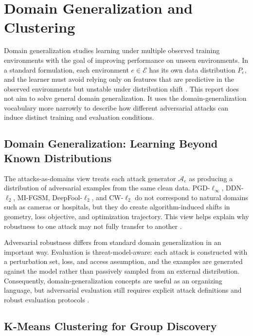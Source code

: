 \section{Domain Generalization and Clustering}

Domain generalization studies learning under multiple observed training environments with the goal of improving performance on unseen environments. In a standard formulation, each environment $e\in\mathcal{E}$ has its own data distribution $P_e$, and the learner must avoid relying only on features that are predictive in the observed environments but unstable under distribution shift \cite{arjovsky2019irm,gulrajani2021domainbed}. This report does not aim to solve general domain generalization. It uses the domain-generalization vocabulary more narrowly to describe how different adversarial attacks can induce distinct training and evaluation conditions.

\subsection{Domain Generalization: Learning Beyond Known Distributions}

The attacks-as-domains view treats each attack generator $\mathcal{A}_e$ as producing a distribution of adversarial examples from the same clean data. PGD-$\ell_\infty$, DDN-$\ell_2$, MI-FGSM, DeepFool-$\ell_2$, and CW-$\ell_2$ do not correspond to natural domains such as cameras or hospitals, but they do create algorithm-induced shifts in geometry, loss objective, and optimization trajectory. This view helps explain why robustness to one attack may not fully transfer to another \cite{tramer2019adversarial,maini2020adversarial}.

Adversarial robustness differs from standard domain generalization in an important way. Evaluation is threat-model-aware: each attack is constructed with a perturbation set, loss, and access assumption, and the examples are generated against the model rather than passively sampled from an external distribution. Consequently, domain-generalization concepts are useful as an organizing language, but adversarial evaluation still requires explicit attack definitions and robust evaluation protocols \cite{croce2020reliable,gulrajani2021domainbed}.

\subsection{K-Means Clustering for Group Discovery}

